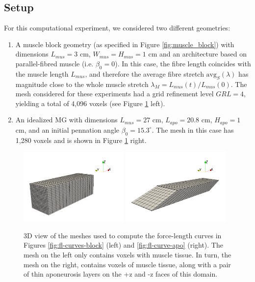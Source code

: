 \documentclass{sfuthesis}
\numberwithin{equation}{section}
\numberwithin{figure}{chapter}
\numberwithin{table}{chapter}
\theoremstyle{definition}
\begin{document}
\subsection{Setup} \label{sec:flexodeal-fl-curve-setup}

For this computational experiment, we considered two different geometries:

\begin{enumerate}
    \item A muscle block geometry (as specified in Figure \ref{fig:muscle_block}) with dimensions $L_{mus} = 3$ cm, $W_{mus} = H_{mus} = 1$ cm and an architecture based on parallel-fibred muscle (i.e. $\beta_0 = 0$). In this case, the fibre length coincides with the muscle length $L_{mus}$, and therefore the average fibre stretch $\mathrm{avg}_S(\lambda)$ has magnitude close to the whole muscle stretch $\lambda_M= L_{mus}(t)/L_{mus}(0)$. The mesh considered for these experiments had a grid refinement level $GRL=4$, yielding a total of 4,096 voxels (see Figure \ref{fig:fl_meshes} left).
    \item An idealized MG with dimensions $L_{mus} = 27$ cm, $L_{apo} = 20.8$ cm, $H_{apo} = 1$ cm, and an initial pennation angle $\beta_0 = 15.3^\circ$. The mesh in this case has 1,280 voxels and is shown in Figure \ref{fig:fl_meshes} right.
\end{enumerate}

\begin{figure}
    \centering
    \includegraphics[width=0.48\textwidth]{fl_mesh_muscle_block.png}
    \includegraphics[width=0.48\textwidth]{fl_mesh_idealized_mg.png}\
    \caption{3D view of the meshes used to compute the force-length curves in Figures \ref{fig:fl-curves-block} (left) and \ref{fig:fl-curve-apo} (right). The mesh on the left only contains voxels with muscle tissue. In turn, the mesh on the right, contains voxels of muscle tissue, along with a pair of thin aponeurosis layers on the +z and -z faces of this domain.
    \label{fig:fl_meshes}}
\end{figure}
\end{document}
